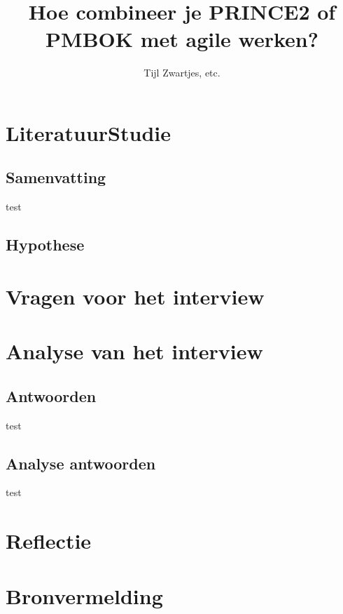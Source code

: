 \documentclass[]{article}
\title{Hoe combineer je PRINCE2 of PMBOK met agile werken?}
\author{Tijl Zwartjes, etc.}
\begin{document}
\maketitle
\begin{abstract}

\end{abstract}

\tableofcontents


\section{LiteratuurStudie}
\subsection{Samenvatting}
test
\subsection{Hypothese}
\section{Vragen voor het interview}

\section{Analyse van het interview}
\subsection{Antwoorden}
test
\subsection{Analyse antwoorden}
test

\section{Reflectie}

\section{Bronvermelding}
\printbibliography
\end{document}
